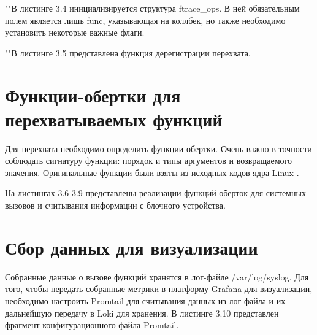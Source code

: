 
""\newline\indent В листинге 3.4 инициализируется структура ftrace\_ops. В ней обязательным полем является лишь func, указывающая на коллбек, но также необходимо установить некоторые важные флаги.\newline


\newpage

""\newline\indent В листинге 3.5 представлена функция дерегистрации перехвата.


\section{Функции-обертки для перехватываемых функций}

Для перехвата необходимо определить функции-обертки. Очень важно в точности соблюдать сигнатуру функции: порядок и типы аргументов и возвращаемого значения. Оригинальные функции были взяты из исходных кодов ядра Linux \cite{linux_core}.

На листингах 3.6-3.9 представлены реализации функций-оберток для системных вызовов и считывания информации с блочного устройства.
\newpage



\newpage


	
\section{Сбор данных для визуализации}

Собранные данные о вызове функций хранятся в лог-файле /var/log/syslog. Для того, чтобы передать собранные метрики в платформу Grafana для визуализации, необходимо настроить Promtail для считывания данных из лог-файла и их дальнейшую передачу в Loki для хранения. В листинге 3.10 представлен фрагмент конфигурационного файла Promtail.\newline

